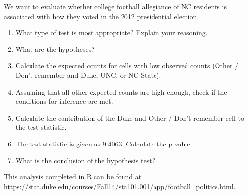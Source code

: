 \documentclass[11pt]{article}
\begin{document}
$\:$ \\
We want to evaluate whether college football allegiance of NC residents is associated with how they voted in the 2012 presidential election.
$\:$ \\
\begin{enumerate}

\item What type of test is most appropriate? Explain your reasoning.

\item What are the hypotheses?

\item Calculate the expected counts for cells with low observed counts (Other / Don't remember and Duke, UNC, or NC State).

\item Assuming that all other expected counts are high enough, check if the conditions for inference are met.

\item Calculate the contribution of the Duke and Other / Don't remember cell to the test statistic.

\item The test statistic is given as 9.4063. Calculate the p-value.

\item What is the conclusion of the hypothesis test?

\end{enumerate}

This analysis completed in R can be found at \url{https://stat.duke.edu/courses/Fall14/sta101.001/app/football_politics.html}.

%
\end{document}
